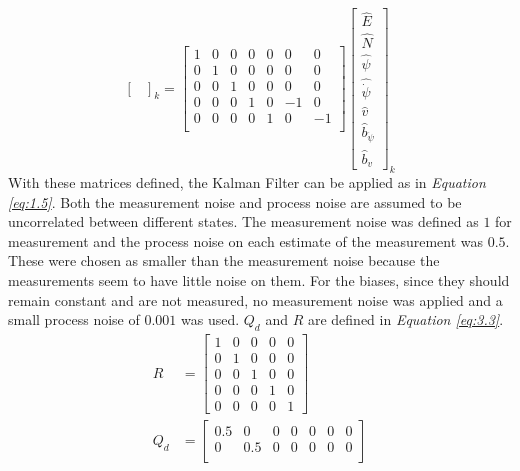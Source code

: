 \documentclass[10pt]{article}
\begin{document}
\begin{enumerate}[label=\textbf{\arabic*.}]
\begin{equation}
\begin{bmatrix}
    \end{bmatrix}_{k}
    = 
    \begin{bmatrix}
      1 & 0 & 0 & 0 & 0 & 0 & 0 \\
      0 & 1 & 0 & 0 & 0 & 0 & 0 \\
      0 & 0 & 1 & 0 & 0 & 0 & 0 \\
      0 & 0 & 0 & 1 & 0 & -1 & 0 \\
      0 & 0 & 0 & 0 & 1 & 0 & -1 \\
    \end{bmatrix}
    \begin{bmatrix} 
      \hat{E} \\ \hat{N} \\ \hat{\psi} \\ \hat{\dot{\psi}} \\ \hat{v} \\ \hat{b}_{\dot{\psi}} \\  \hat{b}_{v} 
    \end{bmatrix}_{k}
    \label{eq:3.2}
  \end{equation}
  With these matrices defined, the Kalman Filter can be applied as in 
  \emph{Equation \ref{eq:1.5}}. Both the measurement noise and process noise are 
  assumed to be uncorrelated between different states. The measurement noise was 
  defined as $1$ for measurement and the process noise on each estimate of the 
  measurement was $0.5$. These were chosen as smaller than the measurement noise 
  because the measurements seem to have little noise on them. For the biases, 
  since they should remain constant and are not measured,  no measurement noise 
  was applied and a small process noise of $0.001$ was used. $Q_d$ and $R$ are 
  defined in \emph{Equation \ref{eq:3.3}}. \\
  \begin{equation}
    \begin{split}
      R &= 
      \begin{bmatrix}
        1 & 0 & 0 & 0 & 0 \\
        0 & 1 & 0 & 0 & 0 \\
        0 & 0 & 1 & 0 & 0 \\
        0 & 0 & 0 & 1 & 0 \\
        0 & 0 & 0 & 0 & 1
      \end{bmatrix} \\
      Q_d &=
      \begin{bmatrix}
        0.5 & 0 & 0 & 0 & 0 & 0 & 0 \\
        0 & 0.5 & 0 & 0 & 0 & 0 & 0 \\

\end{bmatrix}
\end{split}
\end{equation}
\end{enumerate}
\end{document}
